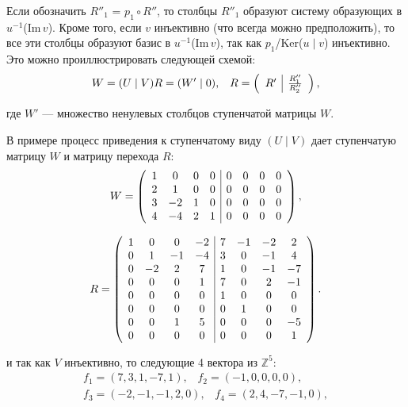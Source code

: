{Если обозначить $R''_1$ = $p_1 \circ R''$, то столбцы $R''_{1}$ образуют систему
образующих в $u^{-1}$(Im{$\,v$}). Кроме того, если $v$ инъективно (что всегда
можно предположить), то все эти столбцы образуют базис в $u^{-1}$(Im{$\,v$}),
так как $p_{1}$/Ker($u \;|\; v$) инъективно. Это можно проиллюстрировать следующей схемой:
\begin{equation*}
W = (U \;|\; V)R = (W' \;|\; 0),\;\;\;R = \left( \begin{array}{cc} R' & \multicolumn{1}{|c}{\frac{R''_{1}}{R''_{2}}} \end{array} \right),
\end{equation*}

\noindent где $W'$ — множество ненулевых столбцов ступенчатой матрицы $W$.

В примере процесс приведения к ступенчатому виду $(U \;|\; V)$ дает
ступенчатую матрицу $W$ и матрицу перехода $R$:
\[ W = {\left( \begin{array}{cccccccc}
1 & 0 & 0 & 0 & \multicolumn{1}{|c}{0} & 0 & 0 & 0 \\
2 & 1 & 0 & 0 & \multicolumn{1}{|c}{0} & 0 & 0 & 0 \\
3 & -2 & 1 & 0 & \multicolumn{1}{|c}{0} & 0 & 0 & 0 \\
4 & -4 & 2 & 1 & \multicolumn{1}{|c}{0} & 0 & 0 & 0
\end{array} \right),} \]

\[ R = {\left( \begin{array}{cccccccc}
1 & 0 & 0 & -2 & \multicolumn{1}{|c}{7} & -1 & -2 & 2 \\
0 & 1 & -1 & -4 & \multicolumn{1}{|c}{3} & 0 & -1 & 4 \\
0 & -2 & 2 & 7 & \multicolumn{1}{|c}{1} & 0 & -1 & -7 \\
0 & 0 & 0 & 1 & \multicolumn{1}{|c}{7} & 0 & 2 & -1 \\
0 & 0 & 0 & 0 & \multicolumn{1}{|c}{1} & 0 & 0 & 0 \\
0 & 0 & 0 & 0 & \multicolumn{1}{|c}{0} & 1 & 0 & 0 \\
0 & 0 & 1 & 5 & \multicolumn{1}{|c}{0} & 0 & 0 & -5 \\
0 & 0 & 0 & 0 & \multicolumn{1}{|c}{0} & 0 & 0 & 1
\end{array} \right).} \]

\noindent и так как $V$ инъективно, то следующие 4 вектора из $\mathbb {Z}^{5}$:
\begin{gather*}
f_1 = (7,3,1,-7,1),\;\;\;f_2 = (-1,0,0,0,0), \\
f_3 = (-2,-1,-1,2,0),\;\;\;f_4 = (2,4,-7,-1,0),
\end{gather*}

}
